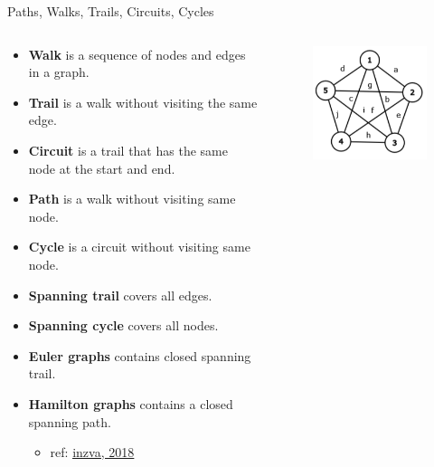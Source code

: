 \documentclass[aspectratio=169]{beamer}%
\begin{document}
\begin{frame}{Paths, Walks, Trails, Circuits, Cycles}
\begin{columns}[T]%
        \begin{column}{.66\textwidth}%
        \begin{itemize}
            \item \textbf{Walk} is a sequence of nodes and edges in a graph.
            \item \textbf{Trail} is a walk without visiting the same edge.
            \item \textbf{Circuit} is a trail that has the same node at the start and end.
            \item \textbf{Path} is a walk without visiting same node.
            \item \textbf{Cycle} is a circuit without visiting same node.
            \item \textbf{Spanning trail} covers all edges.
            \item \textbf{Spanning cycle} covers all nodes.
            \item \textbf{Euler graphs} contains closed spanning trail.
            \item \textbf{Hamilton graphs} contains a closed spanning path.
                \begin{itemize}
                    \item ref: \href{https://github.com/inzva/Algorithm-Program/tree/master/bundles}{\underline{inzva, 2018}}
                \end{itemize}
        \end{itemize}
        \end{column}%
        \hfill
        \begin{column}{.30\textwidth}%
            \begin{figure}%
                \centering%
                \includegraphics[width=.9\linewidth]{graph8.png}%

\end{figure}
\end{column}
\end{columns}
\end{frame}
\end{document}
